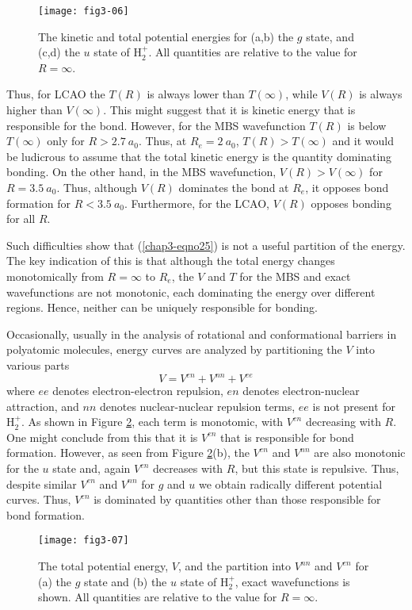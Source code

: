 \begin{figure}
\texttt{[image: fig3-06]}
\caption{The kinetic and total potential energies for (a,b) the $g$ 
state, and (c,d) the $u$ state of H$^+_2$.  All quantities
are relative to the value for $R = \infty$.}
\label{fig3-07}
\end{figure}

Thus, for LCAO the $T(R)$ is always lower than $T(\infty)$, while
$V(R)$ is always higher than $V(\infty)$.  This might suggest that it
is kinetic energy that is responsible for the bond. However, for the
MBS wavefunction $T(R)$ is below $T(\infty)$ only for $R > 2.7\ a_0$.
Thus, at $R_e = 2\ a_0$, $T(R) > T(\infty)$ and it would be ludicrous
to assume that the total kinetic energy is the quantity dominating
bonding.  On the other hand, in the MBS wavefunction, $V(R) >
V(\infty)$ for $R = 3.5\ a_0$.  Thus, although $V(R)$ dominates the
bond at $R_e$, it opposes bond formation for $R < 3.5\ a_0$.
Furthermore, for the LCAO, $V(R)$ opposes bonding for all $R$.

Such difficulties show that (\ref{chap3-eqno25}) is not a useful
partition of the energy. The key indication of this is that although
the total energy changes monotomically from $R = \infty$ to $R_e$, the
$V$ and $T$ for the MBS and exact wavefunctions are not monotonic,
each dominating the energy over different regions. Hence, neither can
be uniquely responsible for bonding.

Occasionally, usually in the analysis of rotational and conformational barriers
in polyatomic molecules, energy curves are analyzed by partitioning 
the $V$ into various parts
\begin{equation}
V = V^{en} + V^{nn} + V^{ee}
\end{equation}
where $ee$ denotes electron-electron repulsion, $en$ denotes
electron-nuclear attraction, and $nn$ denotes nuclear-nuclear
repulsion terms, $ee$ is not present for H$^+_2$. As shown in Figure
\ref{fig3-08}, each term is monotomic, with $V^{en}$ decreasing with
$R$.  One might conclude from this that it is $V^{en}$ that is
responsible for bond formation.  However, as seen from Figure
\ref{fig3-08}(b), the $V^{en}$ and $V^{nn}$ are also monotonic for the
$u$ state and, again $V^{en}$ decreases with $R$, but this state is
repulsive. Thus, despite similar $V^{en}$ and $V^{nn}$ for $g$ and $u$
we obtain radically different potential curves.  Thus, $V^{en}$ is
dominated by quantities other than those responsible for bond
formation.


\begin{figure}
\texttt{[image: fig3-07]}
\caption{The total potential energy, $V$, and the partition 
into $V^{nn}$ and $V^{en}$ for (a) the $g$ state and
(b) the $u$ state of H$^+_2$, exact wavefunctions is shown. All
quantities are relative to the value for $R = \infty$.}
\label{fig3-08}
\end{figure}

